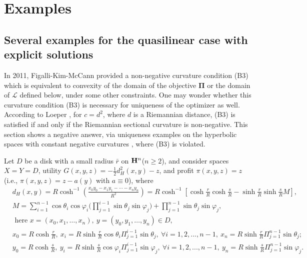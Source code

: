 \chapter{Examples}\label{chapter:examples}




\section{Several examples for the quasilinear case with explicit solutions}
In 2011, Figalli-Kim-McCann \cite{FigalliKimMcCann11} provided a non-negative curvature condition (B3) which is equivalent to convexity of the 
domain of the objective
 $\pmb \Pi$ or the domain of 
 $\mathcal{L}$ defined below, under some other constraints. One may wonder whether this curvature condition (B3) is 
necessary for 
uniqueness of the 
optimizer 
as well. According to Loeper \cite{Loeper09}, 
for $c=d^2$, where $d$ is a Riemannian distance, (B3) is satisfied if and only if the Riemannian sectional curvature is non-negative.
This section shows a negative answer, via uniqueness examples on the hyperbolic spaces with constant negative curvatures%
, where (B3) is violated. \medskip

Let $D$ be a disk with a small radius $\bar{r}$ on ${\mathbf H}^n$($n\ge 2$), and consider spaces $X= Y = D$, utility $G(x,y,z)=-\frac{1}{2}d_H^2(x,y) -z$, and profit $\pi(x,y,z) = z$ (i.e., $\pi(x,y,z) = z -a(y)$ with $a \equiv 0$), where
\begin{equation}\label{distanceh}
\begin{split}
&d_H(x,y)= R\cosh^{-1}(\frac{x_0y_0-x_1y_1-\cdots -x_ny_n}{R^2})= R\cosh^{-1}[\cosh \frac{r}{R}\cosh \frac{s}{R}-\sinh \frac{r}{R}\sinh\frac{s}{R} M],\\
&M=\sum_{i=1}^{n-1}\cos\theta_i \cos\varphi_i\Big(\prod_{j=1}^{i-1} \sin\theta_j\sin\varphi_j\Big)+ \prod_{j=1}^{n-1} \sin\theta_j\sin\varphi_j,\\
&\text{ here } x=(x_0,x_1,\dots, x_n),~y=(y_0,y_1,\dots, y_n) \in D,\\& x_0 = R\cosh \frac{r}{R},~ x_i = R\sinh \frac{r}{R}\cos\theta_i \Pi_{j=1}^{i-1}\sin \theta_j, ~\forall i=1,2,...,n-1, ~x_n = R\sinh \frac{r}{R} \Pi_{j=1}^{n-1}\sin \theta_j;\\
&y_0 = R\cosh \frac{s}{R},~ y_i = R\sinh \frac{s}{R}\cos\varphi_i \Pi_{j=1}^{i-1}\sin \varphi_j, ~\forall i=1,2,...,n-1,~ y_n = R\sinh \frac{s}{R} \Pi_{j=1}^{n-1}\sin \varphi_j.
\end{split}
\end{equation} 

